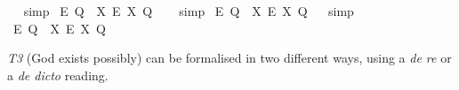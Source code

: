 \begin{isabellebody}
\isadelimproof
\ %
\endisadelimproof
%
\isatagproof
{}\isamarkupfalse%
\ simp%
\endisatagproof
{\isafoldproof}%
%
\isadelimproof
%
\endisadelimproof
\isanewline
{}\isamarkupfalse%
\ {\isachardoublequoteopen}{\isasymlfloor}\isactrlbold {\isasymbox}\isactrlbold {\isasymexists}\isactrlsup E\ {\isacharparenleft}Q{\isacharcolon}{\isacharcolon}{\isasymup}{\isasymlangle}{\isasymzero}{\isasymrangle}{\isacharparenright}\ \isactrlbold {\isasymleftrightarrow}\ {\isacharparenleft}{\isacharparenleft}{\isasymlambda}X{\isachardot}\ \isactrlbold {\isasymbox}\isactrlbold {\isasymexists}\isactrlsup E\ X{\isacharparenright}\ Q{\isacharparenright}{\isasymrfloor}{\isachardoublequoteclose}%
\isadelimproof
\ \ %
\endisadelimproof
%
\isatagproof
{}\isamarkupfalse%
\ simp%
\endisatagproof
{\isafoldproof}%
%
\isadelimproof
%
\endisadelimproof
\isanewline
{}\isamarkupfalse%
\ {\isachardoublequoteopen}{\isasymlfloor}\isactrlbold {\isasymbox}\isactrlbold {\isasymexists}\isactrlsup E\ {\isacharparenleft}Q{\isacharcolon}{\isacharcolon}{\isasymup}{\isasymlangle}{\isasymzero}{\isasymrangle}{\isacharparenright}\ \isactrlbold {\isasymleftrightarrow}\ {\isacharparenleft}{\isacharparenleft}{\isasymlambda}X{\isachardot}\ \isactrlbold {\isasymbox}\isactrlbold {\isasymexists}\isactrlsup E\ \isactrlbold {\isasymdown}X{\isacharparenright}\ Q{\isacharparenright}{\isasymrfloor}{\isachardoublequoteclose}%
\isadelimproof
\ %
\endisadelimproof
%
\isatagproof
{}\isamarkupfalse%
\ simp%
\endisatagproof
{\isafoldproof}%
%
\isadelimproof
%
\endisadelimproof
\isanewline
{}\isamarkupfalse%
\ {\isachardoublequoteopen}{\isasymlfloor}\isactrlbold {\isasymbox}\isactrlbold {\isasymexists}\isactrlsup E\ {\isacharparenleft}Q{\isacharcolon}{\isacharcolon}{\isasymup}{\isasymlangle}{\isasymzero}{\isasymrangle}{\isacharparenright}\ \isactrlbold {\isasymleftrightarrow}\ {\isacharparenleft}{\isacharparenleft}{\isasymlambda}X{\isachardot}\ \isactrlbold {\isasymbox}\isactrlbold {\isasymexists}\isactrlsup E\ X{\isacharparenright}\ \isactrlbold {\isasymdown}Q{\isacharparenright}{\isasymrfloor}{\isachardoublequoteclose}\ \isamarkupfalse%
%
\isadelimproof
\ %
\endisadelimproof
%
\isatagproof
{}\isamarkupfalse%
\ %
%
\endisatagproof
{\isafoldproof}%
%
\isadelimproof
%
\endisadelimproof
%
\begin{isamarkuptext}%
\emph{T3} (God exists possibly) can be formalised in two different ways, using a \emph{de re} or a \emph{de dicto} reading.%
\end{isamarkuptext}\isamarkuptrue%

\end{isabellebody}

